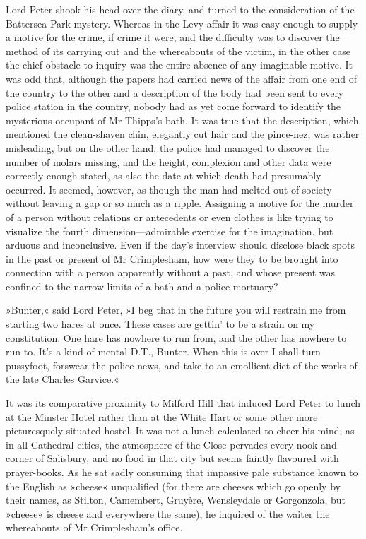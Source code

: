 Lord Peter shook his head over the diary, and turned to the consideration of the Battersea Park mystery. Whereas in the Levy affair it was easy enough to supply a motive for the crime, if crime it were, and the difficulty was to discover the method of its carrying out and the whereabouts of the victim, in the other case the chief obstacle to inquiry was the entire absence of any imaginable motive. It was odd that, although the papers had carried news of the affair from one end of the country to the other and a description of the body had been sent to every police station in the country, nobody had as yet come forward to identify the mysterious occupant of Mr Thipps's bath. It was true that the description, which mentioned the clean-shaven chin, elegantly cut hair and the pince-nez, was rather misleading, but on the other hand, the police had managed to discover the number of molars missing, and the height, complexion and other data were correctly enough stated, as also the date at which death had presumably occurred. It seemed, however, as though the man had melted out of society without leaving a gap or so much as a ripple. Assigning a motive for the murder of a person without relations or antecedents or even clothes is like trying to visualize the fourth dimension—admirable exercise for the imagination, but arduous and inconclusive. Even if the day's interview should disclose black spots in the past or present of Mr Crimplesham, how were they to be brought into connection with a person apparently without a past, and whose present was confined to the narrow limits of a bath and a police mortuary?

»Bunter,« said Lord Peter, »I beg that in the future you will restrain me from starting two hares at once. These cases are gettin' to be a strain on my constitution. One hare has nowhere to run from, and the other has nowhere to run to. It's a kind of mental D.T., Bunter. When this is over I shall turn pussyfoot, forswear the police news, and take to an emollient diet of the works of the late Charles Garvice.«

It was its comparative proximity to Milford Hill that induced Lord Peter to lunch at the Minster Hotel rather than at the White Hart or some other more picturesquely situated hostel. It was not a lunch calculated to cheer his mind; as in all Cathedral cities, the atmosphere of the Close pervades every nook and corner of Salisbury, and no food in that city but seems faintly flavoured with prayer-books. As he sat sadly consuming that impassive pale substance known to the English as »cheese« unqualified (for there are cheeses which go openly by their names, as Stilton, Camembert, Gruyère, Wensleydale or Gorgonzola, but »cheese« is cheese and everywhere the same), he inquired of the waiter the whereabouts of Mr Crimplesham's office.

